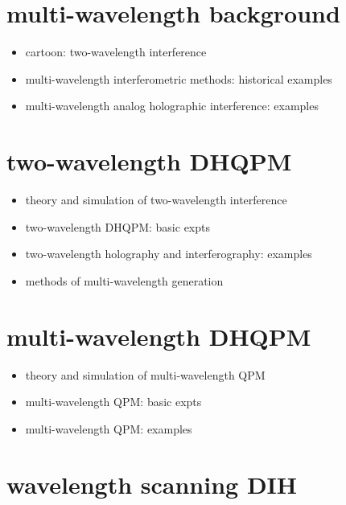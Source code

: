 \documentclass[t, aspectratio=169]{beamer}
\begin{document}
\section{multi-wavelength background}

\begin{frame}{\secname}
	\begin{itemize}
		\item cartoon: two-wavelength interference
		\item multi-wavelength interferometric methods: historical examples
		\item multi-wavelength analog holographic interference: examples
	\end{itemize}
\end{frame}


\section{two-wavelength DHQPM}

\begin{frame}{\secname}
	\begin{itemize}
		\item theory and simulation of two-wavelength interference
		\item two-wavelength DHQPM: basic expts
		\item two-wavelength holography and interferography: examples
		\item methods of multi-wavelength generation
	\end{itemize}
\end{frame}


\section{multi-wavelength DHQPM}

\begin{frame}{\secname}
	\begin{itemize}
		\item theory and simulation of multi-wavelength QPM
		\item multi-wavelength QPM: basic expts
		\item multi-wavelength QPM: examples		
	\end{itemize}
\end{frame}


\section{wavelength scanning DIH}
\end{document}
